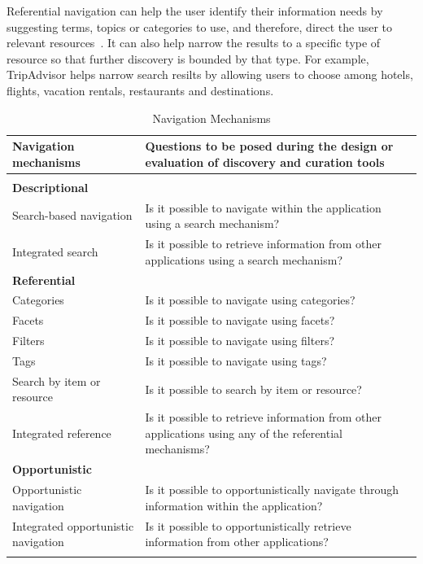 \documentclass{sigchi}
\begin{document}
{{{Referential navigation can help the user identify their information needs by suggesting terms, topics or categories to use, and therefore, direct the user to relevant resources~\cite{levene2011introduction}. It can also help narrow the results to a specific type of resource so that further discovery is bounded by that type. For example, TripAdvisor helps narrow search resilts by allowing users to choose among hotels, flights, vacation rentals, restaurants and destinations.

} %


\begin{table}[ht!]
\caption{Navigation Mechanisms}
\label{table:navigation} 
\begin{tabular}{|p{}| p{}|}
\hline
Navigation mechanisms     	& Questions to be posed during the design or evaluation of  discovery and curation tools \\
\hline
&\\
\textbf{Descriptional} 			& \\
Search-based navigation							& Is it possible to navigate within the application using a search mechanism? \\
Integrated search				& Is it possible to retrieve information from  other applications using a search mechanism? \\
\textbf{Referential}       		& \\
Categories				 		& Is it possible to navigate using categories? \\
Facets				    		& Is it possible to navigate using facets? \\
Filters					  		& Is it possible to navigate using filters? \\
Tags				      		& Is it possible to navigate using tags? \\
Search by item or resource		& Is it possible to search by item or resource? \\
Integrated reference			& Is it possible to retrieve information from other applications using any of the referential mechanisms?\\
\textbf{Opportunistic}          & \\
Opportunistic navigation        & Is it possible to opportunistically navigate through information within the application? \\
Integrated opportunistic navigation        & Is it possible to opportunistically retrieve information from other applications? \\
&\\

\end{tabular}
\end{table}}}
\end{document}
